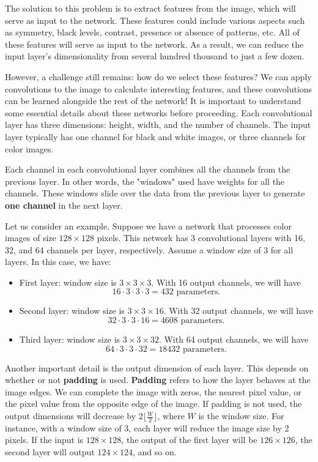 The solution to this problem is to extract features from the image, which will serve as input to the network. These features could include various aspects such as symmetry, black levels, contrast, presence or absence of patterns, etc. All of these features will serve as input to the network. As a result, we can reduce the input layer's dimensionality from several hundred thousand to just a few dozen.


However, a challenge still remains: how do we select these features? We can apply convolutions to the image to calculate interesting features, and these convolutions can be learned alongside the rest of the network! It is important to understand some essential details about these networks before proceeding. Each convolutional layer has three dimensions: height, width, and the number of channels. The input layer typically has one channel for black and white images, or three channels for color images.

Each channel in each convolutional layer combines all the channels from the previous layer. In other words, the "windows" used have weights for all the channels. These windows slide over the data from the previous layer to generate \textbf{one channel} in the next layer.

Let us consider an example. Suppose we have a network that processes color images of size \( 128 \times 128 \) pixels. This network has 3 convolutional layers with 16, 32, and 64 channels per layer, respectively. Assume a window size of 3 for all layers. In this case, we have:

\begin{itemize}
    \item First layer: window size is \( 3 \times 3 \times 3 \). With 16 output channels, we will have 
    \[
    16 \cdot 3 \cdot 3 \cdot 3 = 432 \text{ parameters.}
    \]
    \item Second layer: window size is \( 3 \times 3 \times 16 \). With 32 output channels, we will have 
    \[
    32 \cdot 3 \cdot 3 \cdot 16 = 4608 \text{ parameters.}
    \]
    \item Third layer: window size is \( 3 \times 3 \times 32 \). With 64 output channels, we will have 
    \[
    64 \cdot 3 \cdot 3 \cdot 32 = 18432 \text{ parameters.}
    \]
\end{itemize}


Another important detail is the output dimension of each layer. This depends on whether or not \textbf{padding} is used. \textbf{Padding} refers to how the layer behaves at the image edges. We can complete the image with zeros, the nearest pixel value, or the pixel value from the opposite edge of the image. If padding is not used, the output dimensions will decrease by \( 2 \lfloor \frac{W}{2} \rfloor \), where \( W \) is the window size. For instance, with a window size of 3, each layer will reduce the image size by 2 pixels. If the input is \( 128 \times 128 \), the output of the first layer will be \( 126 \times 126 \), the second layer will output \( 124 \times 124 \), and so on.

